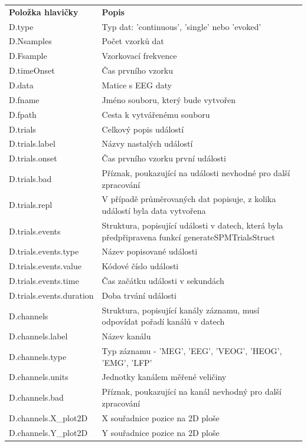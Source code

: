 \begin{table}
\begin{ctucolortab}
\begin{tabular}{lp{8.5cm}}
\bfseries Položka hlavičky & \bfseries Popis \\
\Midrule
D.type & 	Typ dat: 'continuous', 'single' nebo 'evoked' \\
D.Nsamples & 	Počet vzorků dat \\
D.Fsample & 	Vzorkovací frekvence \\
D.timeOnset & 	Čas prvního vzorku \\
D.data & 	Matice s EEG daty \\
D.fname & 	Jméno souboru, který bude vytvořen \\
D.fpath & 	Cesta k vytvářenému souboru \\
D.trials & 	Celkový popis událostí \\
D.trials.label & 	Názvy nastalých událostí \\
D.trials.onset & 	Čas prvního vzorku první události \\
D.trials.bad & 	Příznak, poukazující na události nevhodné pro další zpracování \\
D.trials.repl & 	V případě průměrovaných dat popisuje, z kolika událostí byla data vytvořena \\
D.trials.events & 	Struktura, popisující události v datech, která byla předpřipravena funkcí generateSPMTrialsStruct \\
D.trials.events.type & 	Název popisované události \\
D.trials.events.value & 	Kódové číslo události \\
D.trials.events.time & 	Čas začátku události v sekundách \\
D.trials.events.duration & 	Doba trvání události \\
D.channels & 	Struktura, popisující kanály záznamu, musí odpovídat pořadí kanálů v datech \\
D.channels.label & 	Název kanálu \\
D.channels.type & 	Typ záznamu - 'MEG', 'EEG', 'VEOG', 'HEOG', 'EMG', 'LFP' \\
D.channels.units & 	Jednotky kanálem měřené veličiny  \\
D.channels.bad & 	Příznak, poukazující na kanál nevhodný pro další zpracování \\
D.channels.X\_plot2D & 	X souřadnice pozice na 2D ploše \\
D.channels.Y\_plot2D & 	Y souřadnice pozice na 2D ploše \\

\end{tabular}
\end{ctucolortab}
\end{table}
